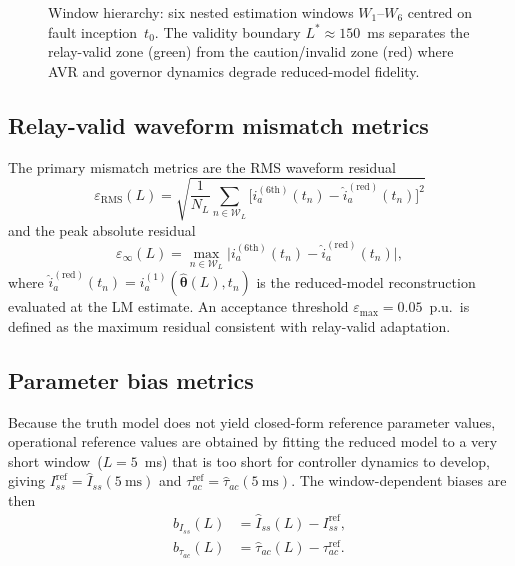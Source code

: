 \documentclass[journal,twoside,letterpaper]{IEEEtran}
\newcommand{\vect}[1]{\bm{#1}}
\begin{document}
\begin{figure}[!t]
  \centering
  
  \caption{Window hierarchy: six nested estimation windows
    $W_1$--$W_6$ centred on fault inception~$t_0$.
    The validity boundary $L^\ast \approx 150$~ms separates
    the relay-valid zone (green) from the caution/invalid
    zone (red) where AVR and governor dynamics degrade
    reduced-model fidelity.}
  \label{fig:window_hierarchy}
\end{figure}

\subsection{Relay-valid waveform mismatch metrics}

The primary mismatch metrics are the RMS waveform residual
\begin{equation}
  \varepsilon_{\mathrm{RMS}}(L) =
    \sqrt{\frac{1}{N_L}\sum_{n \in \mathcal{W}_L}
    \bigl[i_a^{(6\text{th})}(t_n) -
     \hat{i}_a^{(\mathrm{red})}(t_n)\bigr]^2}
\label{eq:eps_rms}
\end{equation}
and the peak absolute residual
\begin{equation}
  \varepsilon_\infty(L) = \max_{n \in \mathcal{W}_L}
    \bigl|i_a^{(6\text{th})}(t_n) -
     \hat{i}_a^{(\mathrm{red})}(t_n)\bigr|,
\label{eq:eps_inf}
\end{equation}
where $\hat{i}_a^{(\mathrm{red})}(t_n) =
i_a^{(1)}(\hat{\vect\theta}(L), t_n)$ is the
reduced-model reconstruction evaluated at the LM estimate.
An acceptance threshold $\varepsilon_{\max} = 0.05$~p.u.\
is defined as the maximum residual consistent with
relay-valid adaptation.

\subsection{Parameter bias metrics}

Because the truth model does not yield closed-form reference
parameter values, operational reference values are obtained
by fitting the reduced model to a very short
window~($L = 5$~ms) that is too short for controller dynamics
to develop, giving
$I_{ss}^{\mathrm{ref}} = \hat{I}_{ss}(5~\text{ms})$ and
$\tau_{ac}^{\mathrm{ref}} = \hat\tau_{ac}(5~\text{ms})$.
The window-dependent biases are then
\begin{align}
  b_{I_{ss}}(L) &= \hat{I}_{ss}(L) - I_{ss}^{\mathrm{ref}}, \\
  b_{\tau_{ac}}(L) &= \hat\tau_{ac}(L) - \tau_{ac}^{\mathrm{ref}}.
\end{align}
\end{document}
